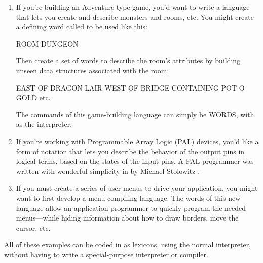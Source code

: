 \begin{enumerate}
\item If you're building an Adventure-type game, you'd want to write a language
that lets you create and describe monsters and rooms, etc. You might
create a defining word called  to be used like this:

\begin{Code}
ROOM DUNGEON
\end{Code}
Then create a set of words to describe the room's attributes by building
unseen data structures associated with the room:

\begin{Code}
EAST-OF DRAGON-LAIR
WEST-OF BRIDGE
CONTAINING POT-O-GOLD
etc.
\end{Code}
The commands of this game-building language can simply be \Forth{}
WORDS, with \Forth{} as the interpreter.

\item If you're working with Programmable Array Logic (PAL) devices,
you'd like a form of notation that lets you describe the behavior of
the output pins in logical terms, based on the states of the input
pins. A PAL programmer was written with wonderful simplicity in
\Forth{} by Michael Stolowitz \cite{stolowitz82}.

\item If you must create a series of user menus to drive your application, you
might want to first develop a menu-compiling language. The words of this
new language allow an application programmer to quickly program the
needed menus---while hiding information about how to draw borders, move
the cursor, etc.
\end{enumerate}
All of these examples can be coded in \Forth{} as lexicons, using the normal
\Forth{} interpreter, without having to write a special-purpose interpreter
or compiler.

